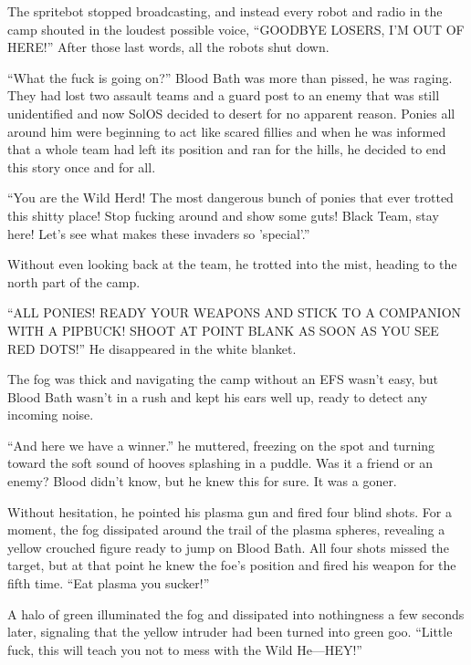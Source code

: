 The spritebot stopped broadcasting, and instead every robot and radio in the camp shouted in the loudest possible voice, ``GOODBYE LOSERS, I'M OUT OF HERE!'' After those last words, all the robots shut down.



\horizonline


``What the fuck is going on?'' Blood Bath was more than pissed, he was raging. They had lost two assault teams and a guard post to an enemy that was still unidentified and now SolOS decided to desert for no apparent reason. Ponies all around him were beginning to act like scared fillies and when he was informed that a whole team had left its position and ran for the hills, he decided to end this story once and for all.

``You are the Wild Herd! The most dangerous bunch of ponies that ever trotted this shitty place! Stop fucking around and show some guts! Black Team, stay here! Let's see what makes these invaders so 'special'.''

Without even looking back at the team, he trotted into the mist, heading to the north part of the camp.

``ALL PONIES! READY YOUR WEAPONS AND STICK TO A COMPANION WITH A PIPBUCK! SHOOT AT POINT BLANK AS SOON AS YOU SEE RED DOTS!'' He disappeared in the white blanket.

The fog was thick and navigating the camp without an EFS wasn't easy, but Blood Bath wasn't in a rush and kept his ears well up, ready to detect any incoming noise.

``And here we have a winner.'' he muttered, freezing on the spot and turning toward the soft sound of hooves splashing in a puddle. Was it a friend or an enemy? Blood didn't know, but he knew this for sure. It was a goner.

Without hesitation, he pointed his plasma gun and fired four blind shots. For a moment, the fog dissipated around the trail of the plasma spheres, revealing a yellow crouched figure ready to jump on Blood Bath. All four shots missed the target, but at that point he knew the foe's position and fired his weapon for the fifth time. ``Eat plasma you sucker!''

A halo of green illuminated the fog and dissipated into nothingness a few seconds later, signaling that the yellow intruder had been turned into green goo. ``Little fuck, this will teach you not to mess with the Wild He---HEY!''

